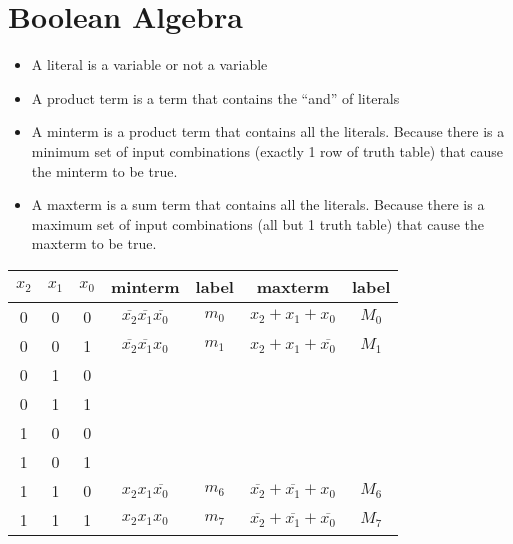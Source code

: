 \documentclass[a4paper, 10pt]{article}
\numberwithin{equation}{section}
\begin{document}
\section{Boolean Algebra}
\begin{definition}
    \begin{itemize}
        \item A literal is a variable or not a variable
        \item A product term is a term that contains the ``and'' of literals
        \item A minterm is a product term that contains all the literals. Because there is a minimum set of input combinations (exactly 1 row of truth table) that cause the minterm to be true.
        \item A maxterm is a sum term that contains all the literals. Because there is a maximum set of input combinations (all but 1 truth table) that cause the maxterm to be true.
    \end{itemize}
\end{definition}
\begin{center}
    \begin{tabular}{|c c c|c|c|c|c|}
        $x_2$ & $x_1$ & $x_0$ & minterm & label & maxterm & label\\
        \hline
        0 & 0 & 0 & $\overline{x_2}\overline{x_1}\overline{x_0}$ & $m_0$ & $x_2+x_1+x_0$ & $M_0$\\
        0 & 0 & 1 & $\overline{x_2}\overline{x_1}{x_0}$ & $m_1$ & $x_2+x_1+\overline{x_0}$ & $M_1$\\
        0 & 1 & 0 \\
        0 & 1 & 1 \\
        1 & 0 & 0 \\ 
        1 & 0 & 1 \\
        1 & 1 & 0 & $x_2x_1\overline{x_0}$ & $m_6$ & $\overline{x_2}+\overline{x_1}+x_0$ & $M_6$\\
        1 & 1 & 1 & $x_2x_1x_0$ & $m_7$ & $\overline{x_2}+\overline{x_1}+\overline{x_0}$ & $M_7$
    \end{tabular}
\end{center}
\end{document}
